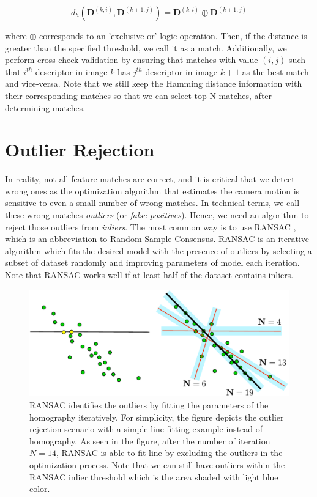 \documentclass[a4paper]{report}
\numberwithin{figure}{section}
\begin{document}
\begin{equation}
  d_h(\mathbf{D}^{(k,i)},\mathbf{D}^{(k+1,j)}) = \mathbf{D}^{(k,i)} \oplus 
  \mathbf{D}^{(k+1, j)}
\end{equation}

where $\oplus$ corresponds to an 'exclusive or' logic operation. Then, if the 
distance is greater than the specified threshold, we call it as a match. 
Additionally, we perform cross-check validation by ensuring that matches 
with value $(i,j)$ such that $i^{th}$ descriptor in image $k$ has $j^{th}$ 
descriptor in image $k+1$ as the best match and vice-versa.
Note that we still keep the Hamming distance information with their 
corresponding matches so that we can select top N matches, after 
determining matches.


\section{Outlier Rejection} \label{sb_sc_ransac}

In reality, not all feature matches are correct, and it is critical that we 
detect wrong ones as the optimization algorithm that estimates the camera 
motion is sensitive to even a small number of wrong matches. In technical 
terms, we call these wrong matches \textit{outliers} (or \textit{false 
positives}). Hence, we need an algorithm to reject those outliers from 
\textit{inliers}.  The most common way is to use RANSAC 
\parencite{Fischler1981b}, 
which is an abbreviation to Random Sample Consensus. RANSAC is an iterative 
algorithm which fits the desired model with the presence of outliers by 
selecting a subset of dataset randomly and improving parameters of model each 
iteration. Note that RANSAC works well if at least half of the dataset 
contains inliers.

\begin{figure}[H]
	\centering
	\includegraphics[width=0.8\linewidth,natwidth=640,natheight=640]
	{fig/drawings/ransac.pdf}
	\caption[Outlier Rejection with RANSAC]
	{RANSAC identifies the outliers by fitting the parameters of the 
	homography iteratively.  For simplicity, the figure depicts the outlier 
	rejection scenario with a simple line fitting example instead of 
	homography. As seen in the figure, after the number of iteration $N=14$, 
	RANSAC is able to fit line by excluding the outliers in the optimization 
	process. Note that we can still have outliers within the RANSAC inlier 
	threshold which is the area shaded with light blue color.} 
	\label{fig:outlier_matches}
\end{figure}
\end{document}
